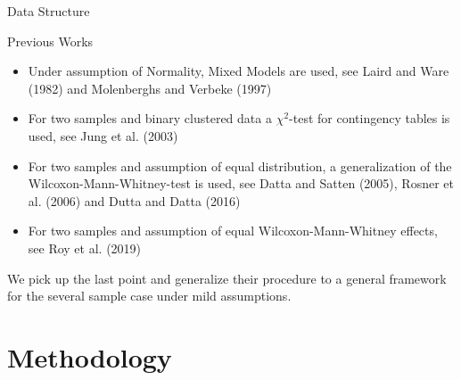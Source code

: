 \documentclass[xcolor=dvipsnames, aspectratio = 169]{beamer}
\begin{document}
\begin{frame}[fragile]{Data Structure}
\begin{center}
\end{center}
\end{frame}
\begin{frame}{Previous Works}
	\begin{itemize}
		\item Under assumption of Normality, Mixed Models are used, see Laird and Ware (1982) and Molenberghs and Verbeke (1997)
		\item For two samples and binary clustered data a $\chi^2$-test for contingency tables is used, see Jung et al. (2003)
		\item For two samples and assumption of equal distribution,  a generalization of the Wilcoxon-Mann-Whitney-test is used, see Datta and Satten (2005), Rosner et al. (2006) and Dutta and Datta (2016)
		\item For two samples and assumption of equal Wilcoxon-Mann-Whitney effects, see Roy et al. (2019)
	\end{itemize}
	We pick up the last point and generalize their procedure to a general framework for the several sample case under mild assumptions.
\end{frame}

\section{Methodology}
\end{document}
